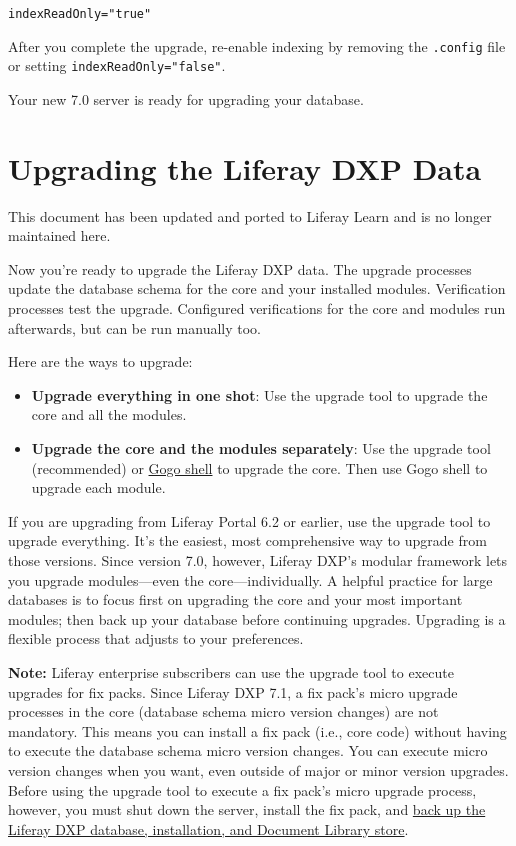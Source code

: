 \begin{verbatim}
indexReadOnly="true"
\end{verbatim}

After you complete the upgrade, re-enable indexing by removing the
\texttt{.config} file or setting \texttt{indexReadOnly="false"}.

Your new 7.0 server is ready for upgrading your database.

\chapter{Upgrading the Liferay DXP
Data}\label{upgrading-the-liferay-dxp-data}

{This document has been updated and ported to Liferay Learn and is no
longer maintained here.}

Now you're ready to upgrade the Liferay DXP data. The upgrade processes
update the database schema for the core and your installed modules.
Verification processes test the upgrade. Configured verifications for
the core and modules run afterwards, but can be run manually too.

Here are the ways to upgrade:

\begin{itemize}
\item
  \textbf{Upgrade everything in one shot}: Use the upgrade tool to
  upgrade the core and all the modules.
\item
  \textbf{Upgrade the core and the modules separately}: Use the upgrade
  tool (recommended) or
  \href{/docs/7-2/deploy/-/knowledge_base/d/upgrading-modules-using-gogo-shell}{Gogo
  shell} to upgrade the core. Then use Gogo shell to upgrade each
  module.
\end{itemize}

If you are upgrading from Liferay Portal 6.2 or earlier, use the upgrade
tool to upgrade everything. It's the easiest, most comprehensive way to
upgrade from those versions. Since version 7.0, however, Liferay DXP's
modular framework lets you upgrade modules---even the
core---individually. A helpful practice for large databases is to focus
first on upgrading the core and your most important modules; then back
up your database before continuing upgrades. Upgrading is a flexible
process that adjusts to your preferences.

\noindent\hrulefill

\textbf{Note:} Liferay enterprise subscribers can use the upgrade tool
to execute upgrades for fix packs. Since Liferay DXP 7.1, a fix pack's
micro upgrade processes in the core (database schema micro version
changes) are not mandatory. This means you can install a fix pack (i.e.,
core code) without having to execute the database schema micro version
changes. You can execute micro version changes when you want, even
outside of major or minor version upgrades. Before using the upgrade
tool to execute a fix pack's micro upgrade process, however, you must
shut down the server, install the fix pack, and
\href{/docs/7-2/deploy/-/knowledge_base/d/backing-up-a-liferay-installation}{back
up the Liferay DXP database, installation, and Document Library store}.

